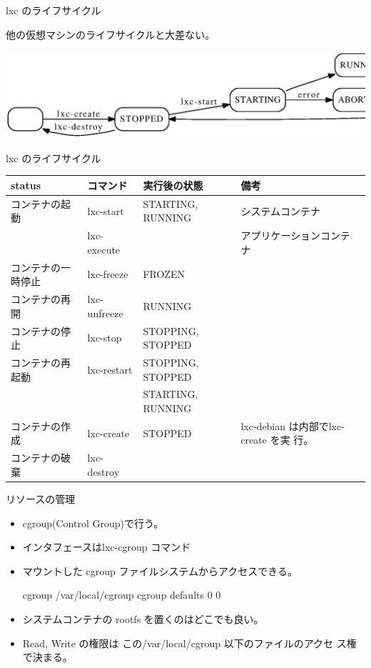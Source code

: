 \begin{frame}{lxc のライフサイクル}

他の仮想マシンのライフサイクルと大差ない。

\includegraphics[width=1.0\hsize]{image200912/lxc/lxc-lifecycle.eps}

\end{frame}

\begin{frame}{lxc のライフサイクル}

{\footnotesize
\begin{tabular}[t]{|p{5em}|p{5em}|p{6em}|p{11em}|}
\hline
status &コマンド &実行後の状態 &備考 \\
\hline
\hline
コンテナの起動 &lxc-start &STARTING, RUNNING &システムコンテナ \\
&lxc-execute & &アプリケーションコンテナ\\
\hline
コンテナの一時停止 &lxc-freeze &FROZEN & \\
\hline
コンテナの再開 &lxc-unfreeze &RUNNING & \\
\hline
コンテナの停止 &lxc-stop &STOPPING, STOPPED & \\
\hline
コンテナの再起動 &lxc-restart &STOPPING, STOPPED & \\
& &STARTING, RUNNING & \\
\hline
コンテナの作成 &lxc-create &STOPPED &lxc-debian は内部でlxc-create を実
             行。 \\
\hline
コンテナの破棄 &lxc-destroy & & \\
\hline
\end{tabular}}

\end{frame}

\begin{frame}[containsverbatim]{リソースの管理}
\begin{itemize}
\item cgroup(Control Group)で行う。
\item インタフェースはlxc-cgroup コマンド
\item マウントした cgroup ファイルシステムからアクセスできる。
\begin{commandline}
cgroup  /var/local/cgroup  cgroup  defaults  0  0
\end{commandline}
\item システムコンテナの rootfs を置くのはどこでも良い。
\item Read, Write の権限は この/var/local/cgroup 以下のファイルのアクセ
      ス権で決まる。
\end{itemize}
\end{frame}

